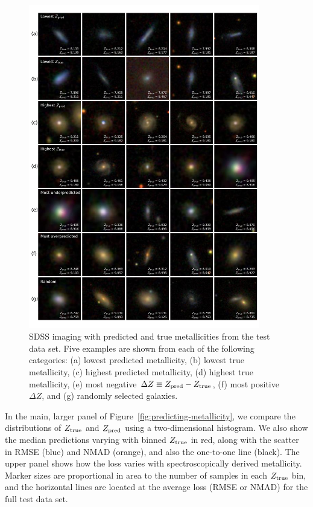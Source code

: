 \documentclass[fleqn,usenatbib]{mnras}
\begin{document}
\begin{figure}
	\includegraphics[width=0.9\textwidth]{01-prediction_examples.pdf}
	\caption{\label{fig:examples}
		SDSS imaging with predicted and true metallicities from the test data set. 
		Five examples are shown from each of the following categories: (a) lowest predicted metallicity, (b) lowest true metallicity, (c) highest predicted metallicity, (d) highest true metallicity, (e) most negative $\Delta Z \equiv Z_{\rm pred} - Z_{\rm true}$, (f) most positive $\Delta Z$, and (g) randomly selected galaxies.}
\end{figure}

In the main, larger panel of Figure~\ref{fig:predicting-metallicity}, we compare the distributions of $Z_{\rm true}$ and $Z_{\rm pred}$ using a two-dimensional histogram.
We also show the median predictions varying with binned $Z_{\rm true}$ in red, along with the scatter in RMSE (blue) and NMAD (orange), and also the one-to-one line (black).
The upper panel shows how the loss varies with spectroscopically derived metallicity.
Marker sizes are proportional in area to the number of samples in each $Z_{\rm true}$ bin, and the horizontal lines are located at the average loss (RMSE or NMAD) for the full test data set.
\end{document}
